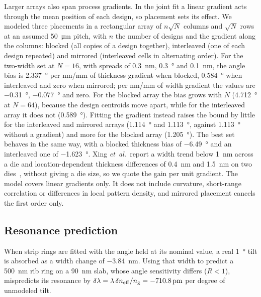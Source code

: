 Larger arrays also span process gradients. In the joint fit a linear gradient acts through the mean position of each design, so placement sets its effect.
We modeled three placements in a rectangular array of $n\sqrt{N}$ columns and $\sqrt{N}$ rows at an assumed \qty{50}{\micro m} pitch, with $n$ the number
of designs and the gradient along the columns: blocked (all copies of a design together), interleaved (one of each design repeated) and mirrored
(interleaved cells in alternating order). For the two-width set at $N=16$, with spreads of \qty{0.3}{nm}, \qty{0.3}{\degree} and \qty{0.1}{nm}, the angle bias is
\qty{2.337}{\degree} per nm/mm of thickness gradient when blocked, \qty{0.584}{\degree} when interleaved and zero when mirrored; per nm/mm of width gradient the values
are \qty{-0.31}{\degree}, \qty{-0.077}{\degree} and zero. For the blocked array the bias grows with $N$ (\qty{4.712}{\degree} at $N=64$), because the design centroids move
apart, while for the interleaved array it does not (\qty{0.589}{\degree}). Fitting the gradient instead raises the bound by little for the interleaved
and mirrored arrays (\qty{1.114}{\degree} and \qty{1.113}{\degree}, against \qty{1.113}{\degree} without a gradient) and more for the blocked array (\qty{1.205}{\degree}). The best set
behaves in the same way, with a blocked thickness bias of \qty{-6.49}{\degree} and an interleaved one of \qty{-1.623}{\degree}. Xing \textit{et~al.}\ report a width trend below
\qty{1}{nm} across a die and location-dependent thickness differences of \qty{0.4}{nm} and \qty{1.5}{nm} on two dies~\cite{xing2018}, without giving a die size, so we
quote the gain per unit gradient. The model covers linear gradients only. It does not include curvature, short-range correlation or differences in
local pattern density, and mirrored placement cancels the first order only.

\subsection{Resonance prediction}
\label{sec:prediction}

When strip rings are fitted with the angle held at its nominal value, a real \qty{1}{\degree} tilt is absorbed as a width
change of \qty{-3.84}{nm}. Using that width to predict a \qty{500}{nm} rib ring on a \qty{90}{nm} slab, whose angle
sensitivity differs ($R<1$), mispredicts its resonance by $\delta\lambda=\lambda\,\delta n_\mathrm{eff}/n_\mathrm{g}=\qty{-710.8}{pm}$ per
degree of unmodeled tilt.


